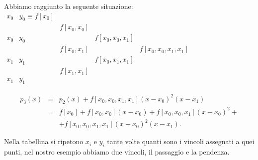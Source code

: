 \begin{itemize}
Abbiamo raggiunto la seguente situazione:\\

$\begin{array}{llllc}
x_0 & y_0 \equiv f[x_0]  &   \\
    &     & f[x_0,x_0] \\
x_0 & y_0  &            & f[x_0,x_0,x_1]  \\
    &     & f[x_0,x_1] &               & f[x_0,x_0,x_1,x_1]\\
x_1 & y_1 &            & f[x_0,x_1,x_1]\\
    &     & f[x_1,x_1]\\
x_1 & y_1
\end{array}$

\[
\begin{array}{lcl}
p_3(x) & = & p_2(x) + f[x_0,x_0,x_1,x_1](x-x_0)^2(x-x_1) \\
       & = & f[x_0] + f[x_0,x_0](x-x_0) + f[x_0,x_0,x_1](x-x_0)^2 +\\
       &   & + f[x_0,x_0,x_1,x_1](x-x_0)^2(x-x_1).
\end{array}
\]

\begin{osse}
Nella tabellina si ripetono $x_i$ e $y_i$ tante volte quanti sono i vincoli
assegnati a quei punti, nel nostro esempio abbiamo due vincoli, il passaggio
e la pendenza.
\end{osse}
\end{itemize}

